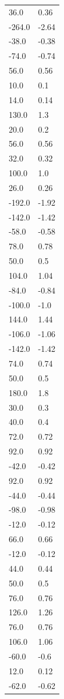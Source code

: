 \begin{longtable}{ll}
36.0 & 0.36 \\
-264.0 & -2.64 \\
-38.0 & -0.38 \\
-74.0 & -0.74 \\
56.0 & 0.56 \\
10.0 & 0.1 \\
14.0 & 0.14 \\
130.0 & 1.3 \\
20.0 & 0.2 \\
56.0 & 0.56 \\
32.0 & 0.32 \\
100.0 & 1.0 \\
26.0 & 0.26 \\
-192.0 & -1.92 \\
-142.0 & -1.42 \\
-58.0 & -0.58 \\
78.0 & 0.78 \\
50.0 & 0.5 \\
104.0 & 1.04 \\
-84.0 & -0.84 \\
-100.0 & -1.0 \\
144.0 & 1.44 \\
-106.0 & -1.06 \\
-142.0 & -1.42 \\
74.0 & 0.74 \\
50.0 & 0.5 \\
180.0 & 1.8 \\
30.0 & 0.3 \\
40.0 & 0.4 \\
72.0 & 0.72 \\
92.0 & 0.92 \\
-42.0 & -0.42 \\
92.0 & 0.92 \\
-44.0 & -0.44 \\
-98.0 & -0.98 \\
-12.0 & -0.12 \\
66.0 & 0.66 \\
-12.0 & -0.12 \\
44.0 & 0.44 \\
50.0 & 0.5 \\
76.0 & 0.76 \\
126.0 & 1.26 \\
76.0 & 0.76 \\
106.0 & 1.06 \\
-60.0 & -0.6 \\
12.0 & 0.12 \\
-62.0 & -0.62 \\

\end{longtable}

